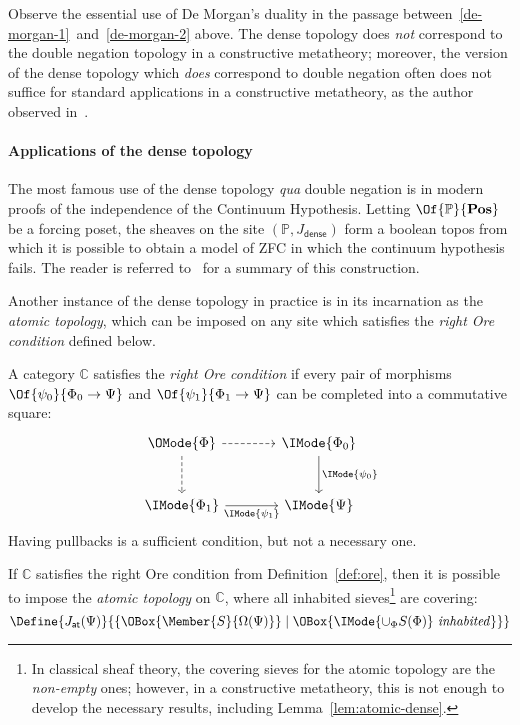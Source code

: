 \documentclass{article}
\newcommand\Posets{\mathbf{Pos}}
\newcommand\JAtomic{J_{\mathsf{at}}}
\newcommand\JDense{J_{\mathsf{dense}}}
\newcommand\IsInh[1]{\IMode{#1}\ \mathit{inhabited}}
\newcommand\MkSet[1]{\{#1\}}
\begin{document}
\begin{remark}
  Observe the essential use of De Morgan's duality in the passage
  between~\ref{de-morgan-1}~and~\ref{de-morgan-2} above. The dense
  topology does \emph{not} correspond to the double negation topology
  in a constructive metatheory; moreover, the version of the dense
  topology which \emph{does} correspond to double negation often does
  not suffice for standard applications in a constructive metatheory,
  as the author observed
  in~\cite{sterling:math-stack-exchange-dense-topology}.
\end{remark}

\paragraph{Applications of the dense topology}
The most famous use of the dense topology \emph{qua} double negation
is in modern proofs of the independence of the Continuum
Hypothesis. Letting $\Of{\mathbb{P}}{\Posets}$ be a forcing poset, the
sheaves on the site $(\mathbb{P},\JDense)$ form a boolean topos from
which it is possible to obtain a model of ZFC in which the continuum
hypothesis fails. The reader is referred
to~\cite{maclane-moerdijk:1992} for a summary of this construction.

Another instance of the dense topology in practice is in its
incarnation as the \emph{atomic topology}, which can be imposed on any
site which satisfies the \emph{right Ore condition} defined below.

\begin{definition}\label{def:ore}
  A category $\mathbb{C}$ satisfies the \emph{right Ore condition} if
  every pair of morphisms
  $\Of{\psi_0}{\Phi_0\to\Psi}$ and
  $\Of{\psi_1}{\Phi_1\to\Psi}$ can be completed into
  a commutative square:
  \[
    \begin{tikzcd}[sep=large]
      \OMode{\Phi}
      \arrow[r,dashed]
      \arrow[d,dashed]
      &
      \IMode{\Phi_0}
      \arrow[d,"\IMode{\psi_0}"]
      \\
      \IMode{\Phi_1}
      \arrow[r,swap,"\IMode{\psi_1}"]
      &
      \IMode{\Psi}
    \end{tikzcd}
  \]
  Having pullbacks is a sufficient condition, but not a necessary one.
\end{definition}

\begin{definition}
  If $\mathbb{C}$ satisfies the right Ore condition from
  Definition~\ref{def:ore}, then it is possible to impose the
  \emph{atomic topology} on $\mathbb{C}$, where all inhabited
  sieves\footnote{In classical sheaf theory, the covering sieves for
    the atomic topology are the \emph{non-empty} ones; however, in a
    constructive metatheory, this is not enough to develop the
    necessary results, including Lemma~\ref{lem:atomic-dense}.}  are
  covering:
  \[
    \Define{
      \JAtomic(\Psi)
    }{
      \MkSet{
        \OBox{\Member{S}{\Omega(\Psi)}}
        \mid
        \OBox{\IsInh{\cup_\Phi S(\Phi)}}
      }
    }
  \]
\end{definition}
\end{document}
